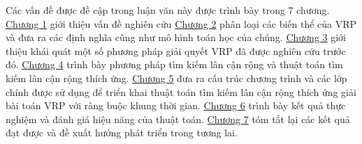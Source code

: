 Các vấn đề được đề cập trong luận văn này được trình bày trong 7 chương. \hyperref[chap:introduction]{Chương 1} giới thiệu vấn đề nghiên cứu \hyperref[chap:model]{Chương 2} phân loại các biến thể của VRP và đưa ra các định nghĩa cũng như mô hình toán học của chúng.
\hyperref[chap:solution]{Chương 3} giới thiệu khái quát một số  phương pháp giải quyết VRP đã được nghiên cứu trước đó.
\hyperref[chap:search]{Chương 4}  trình bày phương pháp tìm kiếm lân cận rộng và thuật toán tìm kiếm lân cận rộng thích ứng.
\hyperref[chap:application]{Chương 5} đưa ra cấu trúc chương trình và các lớp chính được sử dụng để triển khai thuật toán tìm kiếm lân cận rộng thích ứng giải bài toán VRP với ràng buộc khung thời gian.
\hyperref[chap:experiment]{Chương 6} trình bày kết quả thực nghiệm và đánh giá hiệu năng của thuật toán.
\hyperref[chap:conclusion]{Chương 7} tóm tắt lại các kết quả đạt được và đề xuất hướng phát triển trong tương lai.
